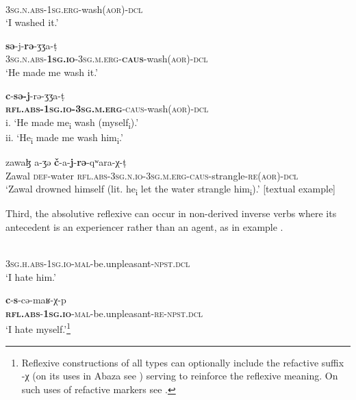 \documentclass[output=paper]{langscibook}
\begin{document}
\ea 
\label{ex:Arkadiev:21}
    \ea 
    \label{ex:Arkadiev:21a}
    \\
    \textsc{3sg.n.abs-1sg.erg}{}-wash(\textsc{aor)-dcl}\\
    \glt ‘I washed it.’
    
    \ex 
    \label{ex:Arkadiev:21b}
    \textbf{{s{ə}}}{{}-j-}\textbf{{r{ə}}}{{}-{ʒ}{ʒ}a-t{̣}}\\
   \textsc{3sg.n.abs-}\textbf{\textsc{1sg.io}}\textsc{{}-3sg.m.erg-}\textbf{\textsc{caus}}\textsc{{}-}wash(\textsc{aor)-dcl}\\
    \glt  ‘He made me wash it.’
    
    \ex 
    \label{ex:Arkadiev:21c}
    \gll \textbf{{c}}{{}-}\textbf{{s{ə}-j}}{{}-r{ə}-{ʒ}{ʒ}a-t{̣}}\\
     \textbf{\textsc{rfl.abs-1sg.io-3sg.m.erg}}\textsc{{}-caus}{}-wash(\textsc{aor)-dcl}\\
    \glt   i.  ‘He made me\textsubscript{i} wash (myself\textsubscript{i}).’\\ ii. ‘He\textsubscript{i} made me wash him\textsubscript{i}.’
    \z
\z


 \ea 
    \label{ex:Arkadiev:22}
    \gll zawa{ɮ} a-{ʒ}{ə} \textbf{{č}}{{}-a-}\textbf{{j}}{{}-}\textbf{{r{ə}}}{{}-q{ʷ}ara-χ-t{̣}}\\
    Zawal  \textsc{def}-water  \textsc{rfl.abs-3sg.n.io-3sg.m.erg-caus}{}-strangle-\textsc{re(aor)-dcl}\\
    \glt ‘Zawal drowned himself (lit. he\textsubscript{i} let the water strangle him\textsubscript{i}).’ [textual example]
\z


Third, the absolutive reflexive can occur in non-derived inverse verbs where its antecedent is an experiencer rather than an agent, as in example .


 \ea 
\label{ex:Arkadiev:23}
    \ea 
    \label{ex:Arkadiev:23a}
    \\
    \textsc{3sg.h.abs-1sg.io-mal}{}-be.unpleasant-\textsc{npst.dcl}\\
    \glt  ‘I hate him.’
    
    \ex 
    \label{ex:Arkadiev:23b}
    \gll \textbf{{c}}{{}-}\textbf{{s}}{{}-c{ə}-ma{ʁ}-χ-p}\\
    \textbf{    }\textbf{\textsc{rfl.abs}}\textsc{{}-}\textbf{\textsc{1sg.io}}\textsc{{}-mal-}be.unpleasant-\textsc{re-npst.dcl}\\
    \glt    ‘I hate myself.’\footnote{Reflexive constructions of all types can optionally include the refactive suffix {{}-χ} (on its uses in Abaza see \citealt{Panova2019}) serving to reinforce the reflexive meaning. On such uses of refactive markers see \citet{Stoynova2010}.}
\z
\z
\end{document}
